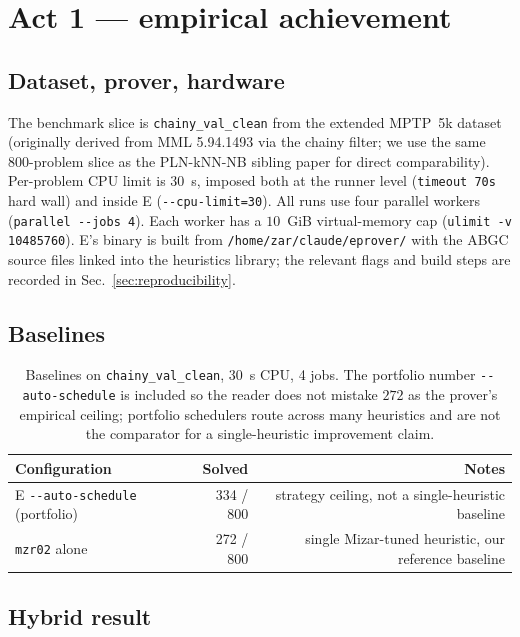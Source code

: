 \documentclass[11pt]{article}
\newcommand{\lpath}[1]{\texttt{\nolinkurl{#1}}}
\newcommand{\lid}[1]{{\ttfamily\nolinkurl{#1}}}
\begin{document}
\section{Act 1 --- empirical achievement}\label{sec:act1}

\subsection{Dataset, prover, hardware}\label{sec:setup}

The benchmark slice is \lpath{chainy_val_clean} from the
extended MPTP~5k dataset (originally derived from MML 5.94.1493 via the
chainy filter; we use the same 800-problem slice as the PLN-kNN-NB
sibling paper for direct comparability). Per-problem CPU limit is $30$~s,
imposed both at the runner level (\lid{timeout 70s} hard wall) and inside
E (\lid{--cpu-limit=30}). All runs use four parallel workers
(\lid{parallel --jobs 4}). Each worker has a $10$~GiB virtual-memory cap
(\lid{ulimit -v 10485760}). E's binary is built from
\lpath{/home/zar/claude/eprover/} with the ABGC source files linked into
the heuristics library; the relevant flags and build steps are recorded in
Sec.~\ref{sec:reproducibility}.

\subsection{Baselines}\label{sec:baselines}

\begin{table}[t]
\centering
\begin{tabular}{lrr}
\toprule
Configuration & Solved & Notes \\
\midrule
E \lid{--auto-schedule} (portfolio) & 334 / 800 & strategy ceiling, not a single-heuristic baseline \\
\texttt{mzr02} alone & 272 / 800 & single Mizar-tuned heuristic, our reference baseline \\
\bottomrule
\end{tabular}
\caption{Baselines on \lpath{chainy_val_clean}, 30~s CPU, 4 jobs.
The portfolio number \lid{--auto-schedule} is included so the reader does
not mistake $272$ as the prover's empirical ceiling; portfolio
schedulers route across many heuristics and are not the comparator for a
single-heuristic improvement claim.}
\label{tab:baselines}
\end{table}

\subsection{Hybrid result}\label{sec:hybrid}
\end{document}
